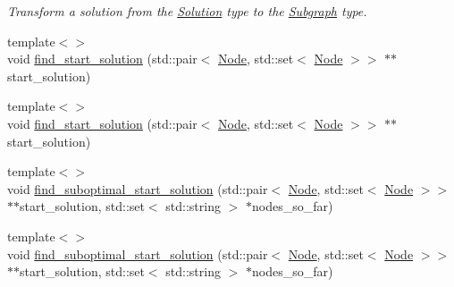 \begin{DoxyCompactItemize}
\begin{DoxyCompactList}\small\item\em Transform a solution from the \hyperlink{structderegnet_1_1Solution}{Solution} type to the \hyperlink{structderegnet_1_1Subgraph}{Subgraph} type. \end{DoxyCompactList}\item 
{\footnotesize template$<$$>$ }\\void \hyperlink{classderegnet_1_1DeregnetFinder_a1b7a50c77d09000e2d80b39025d67393}{find\+\_\+start\+\_\+solution} (std\+::pair$<$ \hyperlink{namespacederegnet_a744bad34f2de9856d36715a445f027f3}{Node}, std\+::set$<$ \hyperlink{namespacederegnet_a744bad34f2de9856d36715a445f027f3}{Node} $>$$>$ $\ast$$\ast$start\+\_\+solution)
\item 
{\footnotesize template$<$$>$ }\\void \hyperlink{classderegnet_1_1DeregnetFinder_a6a5305626ad5039e294fa2f6bd3b4b74}{find\+\_\+start\+\_\+solution} (std\+::pair$<$ \hyperlink{namespacederegnet_a744bad34f2de9856d36715a445f027f3}{Node}, std\+::set$<$ \hyperlink{namespacederegnet_a744bad34f2de9856d36715a445f027f3}{Node} $>$$>$ $\ast$$\ast$start\+\_\+solution)
\item 
{\footnotesize template$<$$>$ }\\void \hyperlink{classderegnet_1_1DeregnetFinder_a42eca7055ed54197e27df7bd70271a13}{find\+\_\+suboptimal\+\_\+start\+\_\+solution} (std\+::pair$<$ \hyperlink{namespacederegnet_a744bad34f2de9856d36715a445f027f3}{Node}, std\+::set$<$ \hyperlink{namespacederegnet_a744bad34f2de9856d36715a445f027f3}{Node} $>$$>$ $\ast$$\ast$start\+\_\+solution, std\+::set$<$ std\+::string $>$ $\ast$nodes\+\_\+so\+\_\+far)
\item 
{\footnotesize template$<$$>$ }\\void \hyperlink{classderegnet_1_1DeregnetFinder_ae81ebb01d3cba09b12858bce7799e2a5}{find\+\_\+suboptimal\+\_\+start\+\_\+solution} (std\+::pair$<$ \hyperlink{namespacederegnet_a744bad34f2de9856d36715a445f027f3}{Node}, std\+::set$<$ \hyperlink{namespacederegnet_a744bad34f2de9856d36715a445f027f3}{Node} $>$$>$ $\ast$$\ast$start\+\_\+solution, std\+::set$<$ std\+::string $>$ $\ast$nodes\+\_\+so\+\_\+far)
\end{DoxyCompactItemize}
